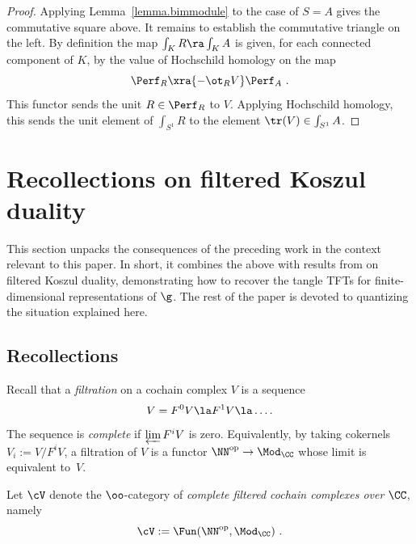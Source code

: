 \documentclass[10pt]{amsart}
\begin{document}
\begin{proof} 
Applying Lemma~\ref{lemma.bimmodule} to the case of $S=A$ gives the commutative square above. It remains to establish the commutative triangle on the left. By definition the map $\int_K R \ra \int_K A$ is given, for each connected component of $K$, by the value of Hochschild homology on the map
\[
\Perf_R \xra{-\ot_R V} \Perf_A~.
\]
This functor sends the unit $R\in\Perf_R$ to $V$. Applying Hochschild homology, this sends the unit element of $\int_{S^1} R$ to the element $\tr(V)\in \int_{S^1}A$.
\end{proof}























    
\section{Recollections on filtered Koszul duality}
\label{sec: filtered KD}

This section unpacks the consequences of the preceding work in the context relevant to this paper.
In short, it combines the above with results from \cite{CosYang} on filtered Koszul duality,
demonstrating how to recover the tangle TFTs for finite-dimensional representations of $\g$.
The rest of the paper is devoted to quantizing the situation explained here.

\subsection{Recollections}

Recall that a {\em filtration} on a cochain complex $V$ is a sequence 
\[
V=F^0V\la F^1 V \la \ldots.
\]
The sequence is {\em complete} if $\varprojlim F^i V$ is zero. 
Equivalently, by taking cokernels $V_i := V/F^i V$, a filtration of $V$ is a functor $\NN^{\rm op} \to \Mod_\CC$ whose limit is equivalent to~$V$.

\begin{dfn}
Let $\cV$ denote the $\oo$-category of {\em complete filtered cochain complexes over $\CC$}, namely
\[
\cV := \Fun(\NN^{\rm op}, \Mod_\CC)~.
\]
\end{dfn}
\end{document}
